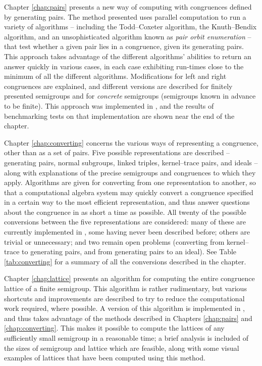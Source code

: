 Chapter \ref{chap:pairs} presents a new way of computing with congruences
defined by generating pairs.  The method presented uses parallel computation to
run a variety of algorithms -- including the Todd--Coxeter algorithm, the Knuth--Bendix algorithm, and an
unsophisticated algorithm known as \textit{pair orbit enumeration} -- that test
whether a given pair lies in a congruence, given its generating pairs.  This
approach takes advantage of the different algorithms' abilities to return an
answer quickly in various cases, in each case exhibiting run-times close to the
minimum of all the different algorithms.  Modifications for left and right
congruences are explained, and different versions are described for finitely
presented semigroups and for \textit{concrete} semigroups (semigroups known in
advance to be finite).  This approach was implemented in
\libsemigroups{} \cite{libsemigroups}, and the results of benchmarking tests on
that implementation are shown near the end of the chapter.

Chapter \ref{chap:converting} concerns the various ways of representing a
congruence, other than as a set of pairs.  Five possible representations are
described -- generating pairs, normal subgroups, linked triples, kernel--trace
pairs, and ideals -- along with explanations of the precise semigroups and
congruences to which they apply.  Algorithms are given for converting from one
representation to another, so that a computational algebra system may quickly
convert a congruence specified in a certain way to the most efficient
representation, and thus answer questions about the congruence in as short a
time as possible.  All twenty of the possible conversions between the five
representations are considered: many of these are currently implemented in
\Semigroups{} \cite{semigroups}, some having never been described before; others
are trivial or unnecessary; and two remain open problems (converting from
kernel--trace to generating pairs, and from generating pairs to an ideal).  See
Table \ref{tab:converting} for a summary of all the conversions described in the
chapter.

Chapter \ref{chap:lattice} presents an algorithm for computing the entire
congruence lattice of a finite semigroup.  This algorithm is rather rudimentary,
but various shortcuts and improvements are described to try to reduce the
computational work required, where possible.  A version of this algorithm is
implemented in \Semigroups{}, and thus takes advantage of the methods described
in Chapters \ref{chap:pairs} and \ref{chap:converting}.  This makes it possible
to compute the lattices of any sufficiently small semigroup in a reasonable
time; a brief analysis is included of the sizes of semigroup and lattice which
are feasible, along with some visual examples of lattices that have been
computed using this method.

